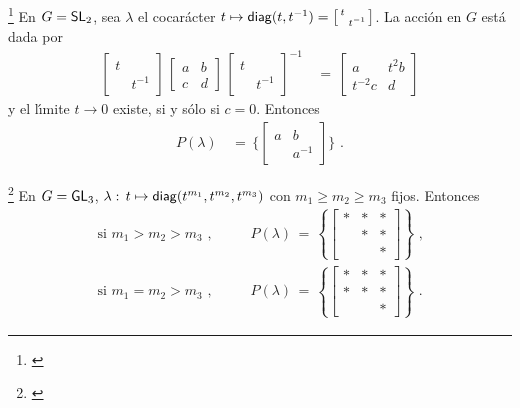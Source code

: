 \begin{ejemploCurvas}\label{ejemplo:curvas:sl}
	\footnote{
		\cite[Example~13.31]{MilneAlgebraicGroups}
	}
	En $G=\SL[2]$, sea $\lambda$ el cocar\'{a}cter
	\begin{math}
		t\mapsto \diag(t,t^{-1})=
			\left[\begin{smallmatrix}
				t & \\
				& t^{-1}
			\end{smallmatrix}\right]
	\end{math}. La acci\'{o}n en $G$ est\'{a} dada por
	\begin{align*}
		\begin{bmatrix} t & \\ & t^{-1} \end{bmatrix}\,
		\begin{bmatrix} a & b \\ c & d \end{bmatrix}\,
		\begin{bmatrix} t & \\ & t^{-1} \end{bmatrix}^{-1} & \,=\,
		\begin{bmatrix}
			a & t^2 b \\ t^{-2}c & d
		\end{bmatrix}
	\end{align*}
	y el l\'{\i}mite $t\to 0$ existe, si y s\'{o}lo si $c=0$. Entonces
	\begin{align*}
		P(\lambda) & \,=\,\bigg\{
			\begin{bmatrix} a & b \\ & a^{-1} \end{bmatrix}
			\bigg\}
		\text{ .}
	\end{align*}
\end{ejemploCurvas}

\begin{ejemploCurvas}\label{ejemplo:curvas:gl}
	\footnote{
		\cite[Example~13.32]{MilneAlgebraicGroups}
	}
	En $G=\GL[3]$, $\lambda:\,t\mapsto\diag(t^{m_1},t^{m_2},t^{m_3})$ con
	$m_1\geq m_2\geq m_3$ fijos. Entonces
	\begin{align*}
		\text{si } m_1>m_2>m_3 \text{ ,} & \qquad
			P(\lambda) \,=\,\left\{
				\begin{bmatrix}
					* & * & * \\
					& * & * \\
					& & *
				\end{bmatrix}
				\right\} \text{ ,} \\
		\text{si } m_1=m_2>m_3 \text{ ,} & \qquad
			P(\lambda) \,=\,\left\{
				\begin{bmatrix}
					* & * & * \\
					* & * & * \\
					& & *
				\end{bmatrix}
				\right\}
			\text{ .}
	\end{align*}
\end{ejemploCurvas}

